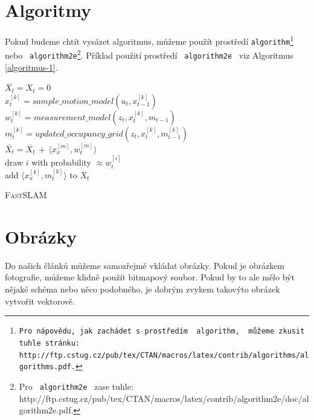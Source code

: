 \documentclass[11pt, a4paper, titlepage] {article}
\begin{document}
\section{Algoritmy}\label{algoritmy}
Pokud budeme chtít vysázet algoritmus, můžeme použít prostředí \texttt{algorithm\footnote{Pro nápovědu, jak zachádet s~prostředím \texttt{ algorithm, } můžeme zkusit tuhle stránku:\\http://ftp.cstug.cz/pub/tex/CTAN/macros/latex/contrib/algorithms/algorithms.pdf.} } nebo \texttt{ algorithm2e}\footnote{Pro \texttt{ algorithm2e } zase tuhle: http://ftp.cstug.cz/pub/tex/CTAN/macros/latex/contrib/algorithm2e/doc/algorithm2e.pdf.}. Příklad použití prostředí \texttt{ algorithm2e } viz Algoritmus \ref{algoritmus-1}.

\bigskip
\begin{algorithm}
\SetNlSty{}{}{:} %
\BlankLine
\SetNlSkip{-1.2em}
\Indp
$\overline{X_t} = X_t = 0$\\  
{	$x_t^{[k]}=sample\_motion\_model(u_t, x_{t-1}^{[k]})$\\
	$w_t^{[k]}=measurement\_model(z_t, x_t^{[k]}, m_{t-1})$\\
	$m_t^{[k]}=updated\_occupancy\_grid(z_t,  x_t^{[k]}, m_{t-1}^{[k]})$\\
	$\overline{X_t} = \overline{X_t}\,+\,\langle x_x^{[m]}, w_t^{[m]}\rangle$\\
}
{	draw $i$ with probability $\approx w_t^{[i]}$\\
	add  $\langle x_x^{[k]}, m_t^{[k]}\rangle$ to $X_t$
}
\caption{\textsc{Fast}SLAM \label{algoritmus-1}}
\end{algorithm}

\section{Obrázky}
Do našich článků můžeme samozřejmě vkládat obrázky. Pokud je obrázkem fotografie, můžeme klidně použít bitmapový soubor. Pokud by to ale mělo být nějaké schéma nebo něco podobného, je dobrým zvykem takovýto obrázek vytvořit vektorově.
\end{document}
